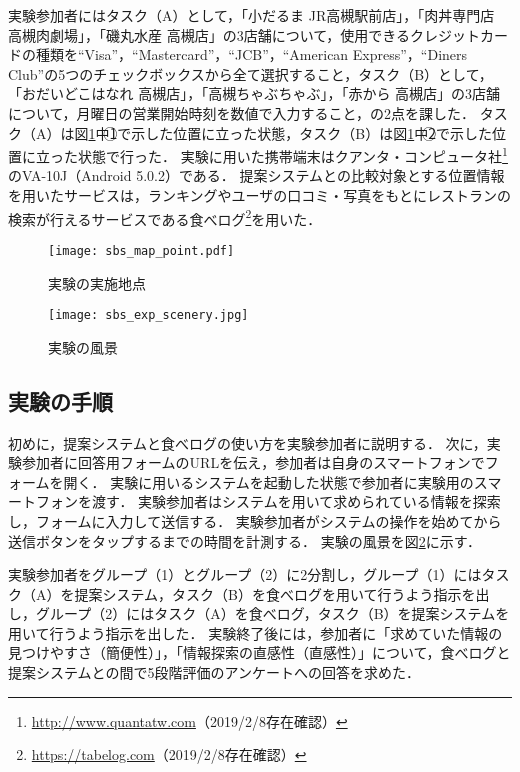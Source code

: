     実験参加者にはタスク（A）として，「小だるま JR高槻駅前店」，「肉丼専門店 高槻肉劇場」，「磯丸水産 高槻店」の3店舗について，使用できるクレジットカードの種類を``Visa''，``Mastercard''，``JCB''，``American Express''，``Diners Club''の5つのチェックボックスから全て選択すること，タスク（B）として，「おだいどこはなれ 高槻店」，「高槻ちゃぶちゃぶ」，「赤から 高槻店」の3店舗について，月曜日の営業開始時刻を数値で入力すること，の2点を課した．
    タスク（A）は図\ref{figure:exp_sbs_point}中\textcircled{\scriptsize 1}で示した位置に立った状態，タスク（B）は図\ref{figure:exp_sbs_point}中\textcircled{\scriptsize 2}で示した位置に立った状態で行った．
    実験に用いた携帯端末はクアンタ・コンピュータ社\footnote{\url{http://www.quantatw.com}（2019/2/8存在確認）}のVA-10J（Android 5.0.2）である．
    提案システムとの比較対象とする位置情報を用いたサービスは，ランキングやユーザの口コミ・写真をもとにレストランの検索が行えるサービスである食べログ\footnote{\url{https://tabelog.com}（2019/2/8存在確認）}を用いた．

  \begin{figure}[tb]
    \begin{center}
      \texttt{[image: sbs\_map\_point.pdf]}
      \caption{実験の実施地点}
      \label{figure:exp_sbs_point}
    \end{center}
  \end{figure}

  \begin{figure}[tb]
    \centerline{\texttt{[image: sbs\_exp\_scenery.jpg]}}
    \caption{実験の風景}
    \label{figure:exp_sbs_scenery}
  \end{figure}

  \subsection{実験の手順}
    初めに，提案システムと食べログの使い方を実験参加者に説明する．
    次に，実験参加者に回答用フォームのURLを伝え，参加者は自身のスマートフォンでフォームを開く．
    実験に用いるシステムを起動した状態で参加者に実験用のスマートフォンを渡す．
    実験参加者はシステムを用いて求められている情報を探索し，フォームに入力して送信する．
    実験参加者がシステムの操作を始めてから送信ボタンをタップするまでの時間を計測する．
    実験の風景を図\ref{figure:exp_sbs_scenery}に示す．

    実験参加者をグループ（1）とグループ（2）に2分割し，グループ（1）にはタスク（A）を提案システム，タスク（B）を食べログを用いて行うよう指示を出し，グループ（2）にはタスク（A）を食べログ，タスク（B）を提案システムを用いて行うよう指示を出した．
    実験終了後には，参加者に「求めていた情報の見つけやすさ（簡便性）」，「情報探索の直感性（直感性）」について，食べログと提案システムとの間で5段階評価のアンケートへの回答を求めた．

